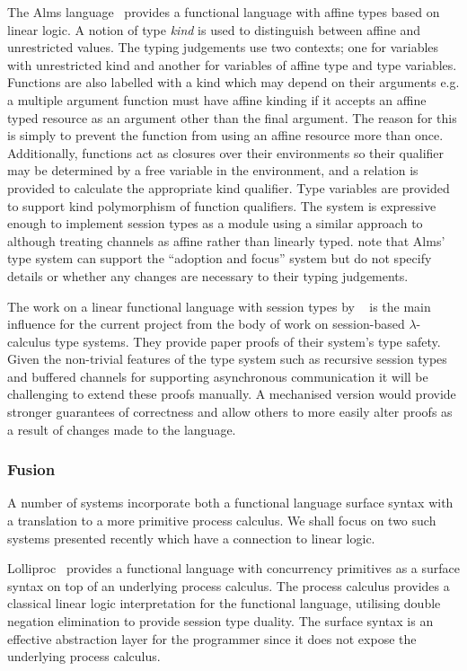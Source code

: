 \documentclass{mprop}
\begin{document}
The Alms language~\cite{Aldrich:2009} provides a functional language with
affine types based on linear logic. A notion of type \textit{kind} is used to
distinguish between affine and unrestricted values. The typing judgements use
two contexts; one for variables with unrestricted kind and another for
variables of affine type and type variables. Functions are also labelled with
a kind which may depend on their arguments e.g. a multiple argument function
must have affine kinding if it accepts an affine typed resource as an argument
other than the final argument. The reason for this is simply to prevent the
function from using an affine resource more than once. Additionally, functions
act as closures over their environments so their qualifier may be determined
by a free variable in the environment, and a relation is provided to calculate
the appropriate kind qualifier. Type variables are provided to support kind
polymorphism of function qualifiers. The system is expressive enough to
implement session types as a module using a similar approach to
\citeauthor{Gay:2010:LAST}~\cite{Gay:2010:LAST} although treating channels as
affine rather than linearly typed. \citeauthor{Aldrich:2009} note that Alms'
type system can support the ``adoption and focus'' system but do not specify
details or whether any changes are necessary to their typing judgements.

The work on a linear functional language with session types by
\citeauthor{Gay:2010:LAST}~\cite{Gay:2010:LAST} is the main influence for the
current project from the body of work on session-based $\lambda$-calculus type
systems. They provide paper proofs of their system's type safety. Given the
non-trivial features of the type system such as recursive session types and
buffered channels for supporting asynchronous communication it will be
challenging to extend these proofs manually. A mechanised version would
provide stronger guarantees of correctness and allow others to more easily
alter proofs as a result of changes made to the language.

\subsubsection{Fusion}

A number of systems incorporate both a functional language surface syntax with
a translation to a more primitive process calculus. We shall focus on two such
systems presented recently which have a connection to linear logic.

Lolliproc~\cite{Mazurak:2010:LCC} provides a functional language with
concurrency primitives as a surface syntax on top of an underlying process
calculus. The process calculus provides a classical linear logic
interpretation for the functional language, utilising double negation
elimination to provide session type duality. The surface syntax is an
effective abstraction layer for the programmer since it does not expose the
underlying process calculus.
\end{document}
